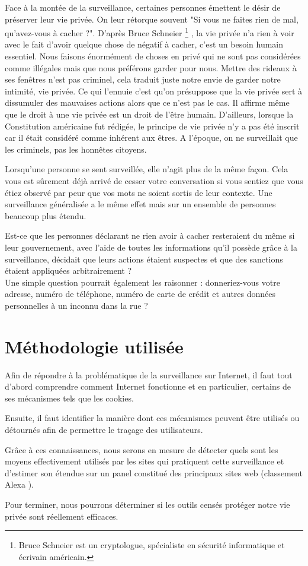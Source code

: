 Face à la montée de la surveillance, certaines personnes émettent le désir de préserver leur vie privée. On leur rétorque souvent "Si vous ne faites rien de mal, qu'avez-vous à cacher ?".
D'après Bruce Schneier \footnote{Bruce Schneier est un cryptologue, spécialiste en sécurité informatique et écrivain américain.} \cite{the_eternal_value_of_privacy}, la vie privée n'a rien à voir avec le fait d'avoir quelque chose de négatif à cacher, c'est un besoin humain essentiel.
Nous faisons énormément de choses en privé qui ne sont pas considérées comme illégales mais que nous préférons garder pour nous. Mettre des rideaux à ses fenêtres n'est pas criminel, cela traduit juste notre envie de garder notre intimité, vie privée.
Ce qui l'ennuie c'est qu'on présuppose que la vie privée sert à dissumuler des mauvaises actions alors que ce n'est pas le cas. Il affirme même que le droit à une vie privée est un droit de l'être humain. D'ailleurs, lorsque la Constitution américaine fut rédigée, le principe de vie privée n'y a pas été inscrit car il était considéré comme inhérent aux êtres. A l'époque, on ne surveillait que les criminels, pas les honnêtes citoyens.

Lorsqu'une personne se sent surveillée, elle n'agit plus de la même façon. Cela vous est sûrement déjà arrivé de cesser votre conversation si vous sentiez que vous étiez observé par peur que vos mots ne soient sortis de leur contexte. Une surveillance généralisée a le même effet mais sur un ensemble de personnes beaucoup plus étendu.
\newline

Est-ce que les personnes déclarant ne rien avoir à cacher resteraient du même si leur gouvernement, avec l'aide de toutes les informations qu'il possède grâce à la surveillance, décidait que leurs actions étaient suspectes et que des sanctions étaient appliquées arbitrairement ?\\
Une simple question pourrait également les raisonner : donneriez-vous votre adresse, numéro de téléphone, numéro de carte de crédit et autres données personnelles à un inconnu dans la rue ?

\section{Méthodologie utilisée}
Afin de répondre à la problématique de la surveillance sur Internet, il faut tout d'abord comprendre comment Internet fonctionne et en particulier, certains de ses mécanismes tels que les cookies.

Ensuite, il faut identifier la manière dont ces mécanismes peuvent être utilisés ou détournés afin de permettre le traçage des utilisateurs.

Grâce à ces connaissances, nous serons en mesure de détecter quels sont les moyens effectivement utilisés par les sites qui pratiquent cette surveillance et d'estimer son étendue sur un panel constitué des principaux sites web (classement Alexa \cite{AlexaTop}).

Pour terminer, nous pourrons déterminer si les outils censés protéger notre vie privée sont réellement efficaces. %
